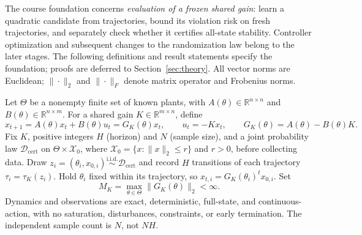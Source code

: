 The course foundation concerns \emph{evaluation of a frozen shared gain}:
learn a quadratic candidate from trajectories, bound its violation risk on
fresh trajectories, and separately check whether it certifies all-state
stability. Controller optimization and subsequent changes to the
randomization law belong to the later stages. The following definitions
and result statements specify the foundation; proofs are deferred to
Section~\ref{sec:theory}. All vector norms are Euclidean;
$\|\cdot\|_2$ and $\|\cdot\|_F$ denote matrix operator and Frobenius norms.

\begin{definition}
\label{def:foundation_experiment}
Let $\Theta$ be a nonempty finite set of known plants, with
$A(\theta)\in\mathbb R^{n\times n}$ and
$B(\theta)\in\mathbb R^{n\times m}$. For a shared gain
$K\in\mathbb R^{m\times n}$, define
\begin{equation}
\label{eq:foundation_closed_loop}
 x_{t+1}=A(\theta)x_t+B(\theta)u_t=G_K(\theta)x_t,
 \qquad u_t=-Kx_t,\qquad G_K(\theta)=A(\theta)-B(\theta)K.
\end{equation}
Fix $K$, positive integers $H$ (horizon) and $N$ (sample size), and a joint probability
law $\mathcal D_{\mathrm{cert}}$ on
$\Theta\times\mathcal X_0$, where
$\mathcal X_0=\{x:\|x\|_2\le r\}$ and $r>0$, before collecting data.
Draw $z_i=(\theta_i,x_{0,i})\stackrel{\mathrm{i.i.d.}}{\sim}
\mathcal D_{\mathrm{cert}}$ and record $H$ transitions of each trajectory
$\tau_i=\tau_K(z_i)$. Hold $\theta_i$ fixed within its trajectory, so
$x_{t,i}=G_K(\theta_i)^t x_{0,i}$. Set
\begin{equation}
\label{eq:foundation_dynamics_bound}
 M_K=\max_{\theta\in\Theta}\|G_K(\theta)\|_2<\infty.
\end{equation}
Dynamics and observations are exact, deterministic, full-state, and
continuous-action, with no saturation, disturbances, constraints, or early
termination. The independent sample count is $N$, not $NH$.
\end{definition}

